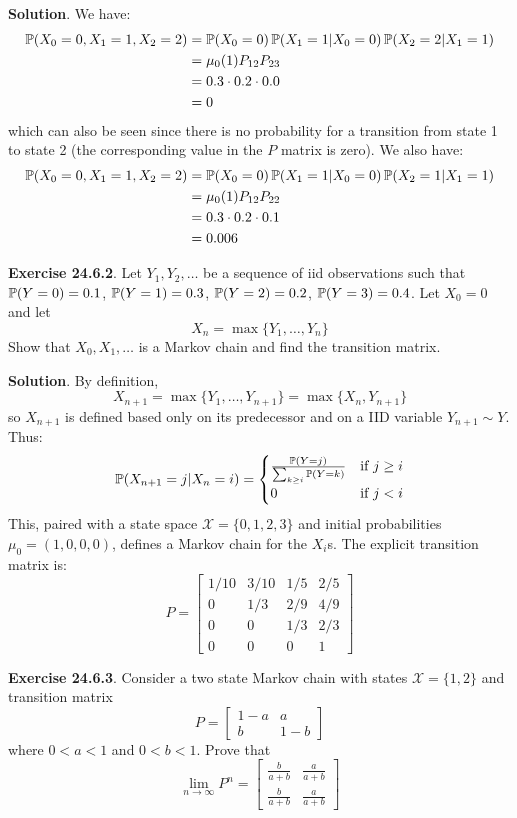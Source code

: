 \textbf{Solution}.
We have:
\begin{align*}
\operatorname{\mathbb{P}}(X_{0} = 0, X_{1} = 1, X_{2} = 2) &= \operatorname{\mathbb{P}}(X_{0} = 0) \operatorname{\mathbb{P}}(X_{1} = 1 | X_{0} = 0) \operatorname{\mathbb{P}}(X_{2} = 2 | X_{1} = 1) \\
&= \mu_{0}(1) P_{12} P_{23} \\
& = 0.3 \cdot 0.2 \cdot 0.0 \\
& = 0
\end{align*}
which can also be seen since there is no probability for a transition
from state 1 to state 2 (the corresponding value in the \(P\) matrix is
zero).
We also have:
\begin{align*}
\operatorname{\mathbb{P}}(X_{0} = 0, X_{1} = 1, X_{2} = 2) &= \operatorname{\mathbb{P}}(X_{0} = 0) \operatorname{\mathbb{P}}(X_{1} = 1 | X_{0} = 0) \operatorname{\mathbb{P}}(X_{2} = 1 | X_{1} = 1) \\
&= \mu_{0}(1) P_{12} P_{22} \\
& = 0.3 \cdot 0.2 \cdot 0.1 \\
& = 0.006
\end{align*}

\textbf{Exercise 24.6.2}. Let \(Y_{1}, Y_{2}, \dots\) be a sequence of iid
observations such that \(\operatorname{\mathbb{P}}(Y = 0) = 0.1\),
\(\operatorname{\mathbb{P}}(Y = 1) = 0.3\), \(\operatorname{\mathbb{P}}(Y = 2) = 0.2\),
\(\operatorname{\mathbb{P}}(Y = 3) = 0.4\). Let \(X_{0} = 0\) and let
\[
X_{n} = \max \{ Y_{1}, \dots, Y_{n} \}
\]
Show that \(X_{0}, X_{1}, \dots\) is a Markov chain and find the transition
matrix.

\textbf{Solution}. By definition,
\[
X_{n + 1} = \max \{Y_{1}, \dots, Y_{n+1} \} = \max \{ X_{n}, Y_{n + 1} \}
\]
so \(X_{n + 1}\) is defined based only on its predecessor and on a IID
variable \(Y_{n+1} \sim Y\). Thus:
\[
\operatorname{\mathbb{P}}(X_{n + 1} = j | X_{n} = i) = \begin{cases}
\frac{\operatorname{\mathbb{P}}(Y = j)}{\sum_{k \geq i} \operatorname{\mathbb{P}}(Y = k)} & \text{if } j \geq i \\
0 &\text{if } j < i
\end{cases}
\]
This, paired with a state space $\mathcal{X} = \{ 0, 1, 2, 3 \} $ and
initial probabilities \(\mu_{0} = (1, 0, 0, 0)\), defines a Markov chain
for the \(X_{i}\)s. The explicit transition matrix is:
\[
P = \begin{bmatrix}
1/10 & 3/10 & 1/5 & 2/5 \\
0   & 1/3 & 2/9 & 4/9 \\
0   & 0   & 1/3 & 2/3 \\
0   & 0   & 0   & 1
\end{bmatrix}
\]

\textbf{Exercise 24.6.3}. Consider a two state Markov chain with states
\(\mathcal{X} = \{ 1, 2 \}\) and transition matrix
\[
P = \begin{bmatrix}
1 - a & a \\
b & 1 - b
\end{bmatrix}
\]
where \(0 < a < 1\) and \(0 < b < 1\). Prove that
\[
\lim_{n \rightarrow \infty} P^{n} = \begin{bmatrix}
\frac{b}{a + b} & \frac{a}{a + b} \\
\frac{b}{a + b} & \frac{a}{a + b}
\end{bmatrix}
\]

